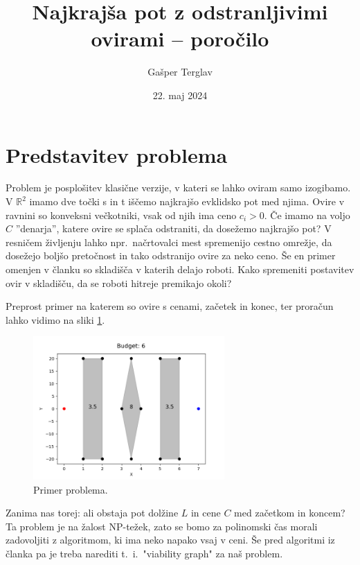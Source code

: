 \documentclass{article}
\author{Gašper Terglav}
\date{22. maj 2024}
\title{Najkrajša pot z odstranljivimi ovirami --  poročilo}
\begin{document}
\maketitle


\section*{Predstavitev problema}

Problem je posplošitev klasične verzije, v kateri se lahko oviram samo izogibamo. V $\mathbb{R}^2$ imamo dve točki s in t iščemo najkrajšo evklidsko pot med njima. Ovire v ravnini so konveksni večkotniki, vsak od njih ima ceno $c_i > 0$. Če imamo na voljo $C$ ''denarja'', katere ovire se splača odstraniti, da dosežemo najkrajšo pot? V resničem življenju lahko npr.\ načrtovalci mest spremenijo cestno omrežje, da dosežejo boljšo pretočnost in tako odstranijo ovire za neko ceno. Še en primer omenjen v članku so skladišča v katerih delajo roboti. Kako spremeniti postavitev ovir v skladišču, da se roboti hitreje premikajo okoli? 

Preprost primer na katerem so ovire s cenami, začetek in konec, ter proračun lahko vidimo na sliki \ref{fig:errPr1}.

\begin{figure}[h]
    \centering
    \includegraphics[width=0.65\textwidth]{err1.png}
    \caption{Primer problema.}
    \label{fig:errPr1}
\end{figure}


Zanima nas torej: ali obstaja pot dolžine $L$ in cene $C$ med začetkom in koncem? Ta problem je na žalost NP-težek, zato se bomo za polinomski čas morali zadovoljiti z algoritmom, ki ima neko napako vsaj v ceni. Še pred algoritmi iz članka pa je treba narediti t.~i.\ "viability graph" za naš problem.



\end{document}
